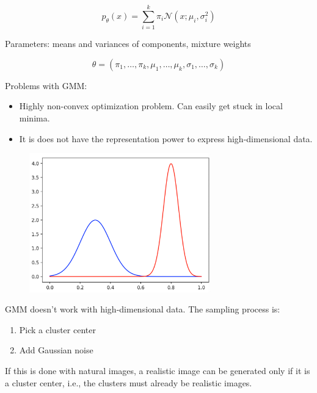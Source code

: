 \begin{concept}
    $$
    p_{\theta}(x)=\sum_{i=1}^{k} \pi_{i} \mathcal{N}\left(x ; \mu_{i}, \sigma_{i}^{2}\right)
    $$

    Parameters: means and variances of components, mixture weights

    $$
    \theta=\left(\pi_{1}, \ldots, \pi_{k}, \mu_{1}, \ldots, \mu_{k}, \sigma_{1}, \ldots, \sigma_{k}\right)
    $$

    Problems with GMM:

    \begin{itemize}
        \item Highly non-convex optimization problem. Can easily get stuck in local minima.
        \item It is does not have the representation power to express high-dimensional data.
    \end{itemize}

    \begin{figure}[H]
        \centering
        \includegraphics[width=0.7\textwidth]{.././assets/10.1.png}
    \end{figure}

    \par\noindent\textcolor{gray}{\hdashrule{\textwidth}{0.4pt}{1pt 2pt}}

    GMM doesn't work with high-dimensional data. The sampling process is:

    \begin{enumerate}
        \item Pick a cluster center
        \item Add Gaussian noise
    \end{enumerate}

    If this is done with natural images, a realistic image can be generated only if it is a cluster center, i.e., the clusters must already be realistic images.


\end{concept}
